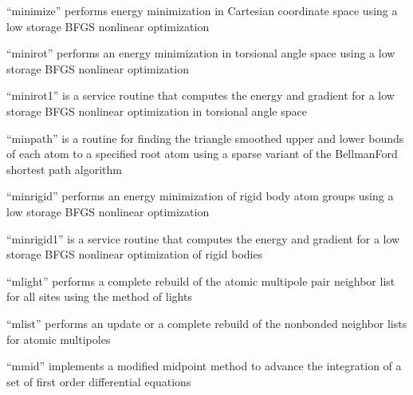 \documentclass[letterpaper,11pt,english]{sphinxmanual}
\begin{document}

“minimize” performs energy minimization in Cartesian coordinate
space using a low storage BFGS nonlinear optimization


“minirot” performs an energy minimization in torsional
angle space using a low storage BFGS nonlinear optimization


“minirot1” is a service routine that computes the energy
and gradient for a low storage BFGS nonlinear optimization
in torsional angle space


“minpath” is a routine for finding the triangle smoothed upper
and lower bounds of each atom to a specified root atom using a
sparse variant of the Bellman\sphinxhyphen{}Ford shortest path algorithm


“minrigid” performs an energy minimization of rigid body atom
groups using a low storage BFGS nonlinear optimization


“minrigid1” is a service routine that computes the energy
and gradient for a low storage BFGS nonlinear optimization
of rigid bodies


“mlight” performs a complete rebuild of the atomic multipole
pair neighbor list for all sites using the method of lights


“mlist” performs an update or a complete rebuild of the
nonbonded neighbor lists for atomic multipoles


“mmid” implements a modified midpoint method to advance the
integration of a set of first order differential equations





\end{document}
